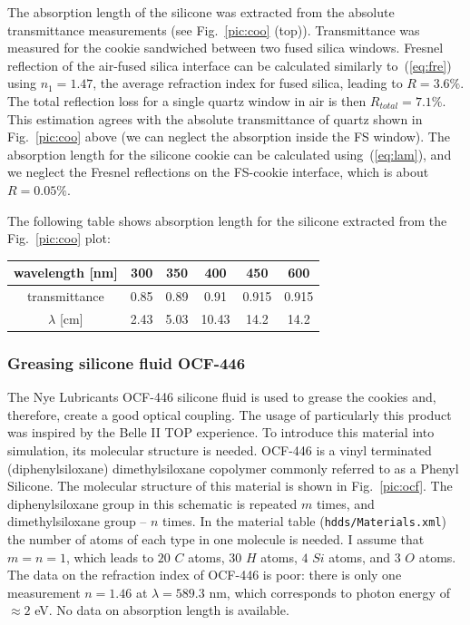The absorption length of the silicone was extracted from the absolute transmittance measurements (see Fig.~\ref{pic:coo} (top)). Transmittance was measured for the cookie sandwiched between two fused silica windows. Fresnel reflection of the air-fused silica interface can be calculated similarly to~(\ref{eq:fre}) using $n_1 = 1.47$, the average refraction index for fused silica, leading to $R = 3.6 \%$. The total reflection loss for a single quartz window in air is then $R_{total} = 7.1 \%$. This estimation agrees with the absolute transmittance of quartz shown in Fig.~\ref{pic:coo} above (we can neglect the absorption inside the FS window). The absorption length for the silicone cookie can be calculated using~(\ref{eq:lam}), and we neglect the Fresnel reflections on the FS-cookie interface, which is about $R = 0.05 \%$.

The following table shows absorption length for the silicone extracted from the Fig.~\ref{pic:coo} plot:


\begin{center}
\begin{tabular}{| c | c | c | c | c | c|}
\hline
wavelength [nm] & 300 & 350 & 400 & 450 & 600 \\
\hline
transmittance & 0.85 & 0.89 & 0.91 & 0.915 & 0.915 \\
\hline
$\lambda$ [cm] & 2.43 & 5.03 & 10.43 & 14.2 & 14.2 \\
\hline
\end{tabular}
\end{center}

\subsubsection*{Greasing silicone fluid OCF-446}

The Nye Lubricants OCF-446 silicone fluid is used to grease the cookies and, therefore, create a good optical coupling. The usage of particularly this product was inspired by the Belle II TOP experience. To introduce this material into simulation, its molecular structure is needed. OCF-446 is a vinyl terminated (diphenylsiloxane) dimethylsiloxane copolymer commonly referred to as a Phenyl Silicone. The molecular structure of this material is shown in Fig.~\ref{pic:ocf}. The diphenylsiloxane group in this schematic is repeated $m$ times, and dimethylsiloxane group -- $n$ times. In the material table (\texttt{hdds/Materials.xml}) the number of atoms of each type in one molecule is needed. I assume that $m = n = 1$, which leads to $20$ $C$ atoms, $30$ $H$ atoms, $4$ $Si$ atoms, and $3$ $O$ atoms. The data on the refraction index of OCF-446 is poor: there is only one measurement $n = 1.46$ at $\lambda = 589.3$ nm, which corresponds to photon energy of $\approx 2$  eV. No data on absorption length is available.

